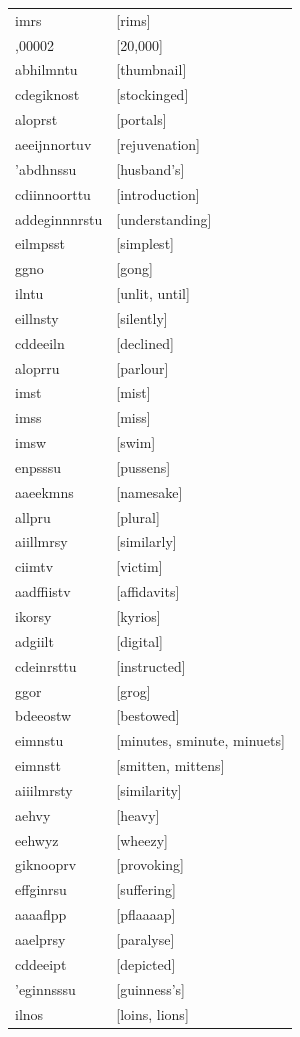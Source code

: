 \documentclass{article}
\begin{document}
\begin{tabular}{ll}
imrs & [rims] \\
,00002 & [20,000] \\
abhilmntu & [thumbnail] \\
cdegiknost & [stockinged] \\
aloprst & [portals] \\
aeeijnnortuv & [rejuvenation] \\
'abdhnssu & [husband's] \\
cdiinnoorttu & [introduction] \\
addeginnnrstu & [understanding] \\
eilmpsst & [simplest] \\
ggno & [gong] \\
ilntu & [unlit, until] \\
eillnsty & [silently] \\
cddeeiln & [declined] \\
aloprru & [parlour] \\
imst & [mist] \\
imss & [miss] \\
imsw & [swim] \\
enpsssu & [pussens] \\
aaeekmns & [namesake] \\
allpru & [plural] \\
aiillmrsy & [similarly] \\
ciimtv & [victim] \\
aadffiistv & [affidavits] \\
ikorsy & [kyrios] \\
adgiilt & [digital] \\
cdeinrsttu & [instructed] \\
ggor & [grog] \\
bdeeostw & [bestowed] \\
eimnstu & [minutes, sminute, minuets] \\
eimnstt & [smitten, mittens] \\
aiiilmrsty & [similarity] \\
aehvy & [heavy] \\
eehwyz & [wheezy] \\
giknooprv & [provoking] \\
effginrsu & [suffering] \\
aaaaflpp & [pflaaaap] \\
aaelprsy & [paralyse] \\
cddeeipt & [depicted] \\
'eginnsssu & [guinness's] \\
ilnos & [loins, lions] \\

\end{tabular}
\end{document}
